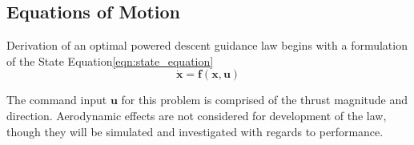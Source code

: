 %
%
%
%
%
%
%











\subsection{Equations of Motion}
Derivation of an optimal powered descent guidance law begins with a formulation of the State Equation\:\ref{eqn:state_equation}
\begin{equation}
\dot{\boldsymbol{x}} = \boldsymbol{f}(\boldsymbol{x,\boldsymbol{u}})
\label{eqn:state_equation}
\end{equation}

The command input $\boldsymbol{u}$ for this problem is comprised of the thrust magnitude and direction. Aerodynamic effects are not considered for development of the law, though they will be simulated and investigated with regards to performance.

